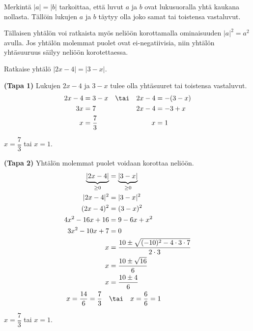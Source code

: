 Merkintä $|a|=|b|$ tarkoittaa, että luvut $a$ ja $b$ ovat lukusuoralla yhtä kaukana nollasta. Tällöin lukujen $a$ ja $b$ täytyy olla joko samat tai toistensa vastaluvut.


Tällaisen yhtälön voi ratkaista myös neliöön korottamalla ominaisuuden $|a|^2=a^2$ avulla. Jos yhtälön molemmat puolet ovat ei-negatiivisia, niin yhtälön yhtäsuuruus säilyy neliöön korotettaessa.


\begin{esimerkki}
	Ratkaise yhtälö $|2x-4|=|3-x|$.
	\begin{esimratk}
		\textbf{(Tapa 1)} Lukujen $2x-4$ ja $3-x$ tulee olla yhtäsuuret tai toistensa vastaluvut.
		\begin{align*}
			2x-4 & =3-x & &\tai & 2x-4 & =-(3-x) \\
			3x & =7 && & 2x-4 & =-3+x \\
			x & =\frac{7}{3} && & x & =1
		\end{align*}
	\end{esimratk}
	\begin{esimvast}
		$x=\dfrac{7}{3}$ tai $x=1$.
	\end{esimvast}
	\begin{esimratk}
		\textbf{(Tapa 2)} Yhtälön molemmat puolet voidaan korottaa neliöön.
		\begin{align*}
			\underbrace{|2x-4|}_{\geq0} &= \underbrace{|3-x|}_{\geq0}    \\
			|2x-4|^2 &= |3-x|^2   \\
			(2x-4)^2 &= (3-x)^2   \\
			4x^2-16x+16 &= 9 -6x + x^2   \\
			3x^2-10x+7 &= 0   \\
			x &= \frac{10\pm\sqrt{(-10)^2-4\cdot 3\cdot 7}}{2\cdot 3}   \\
			x &= \frac{10\pm\sqrt{16}}{6}   \\		
			x &= \frac{10\pm4}{6}     \\
			x=\frac{14}{6}=\frac{7}{3} \quad  &\tai \quad x=\frac{6}{6}=1 \\
		\end{align*}
	\end{esimratk}
	\begin{esimvast}
		$x=\dfrac{7}{3}$ tai $x=1$.
	\end{esimvast}
\end{esimerkki}

